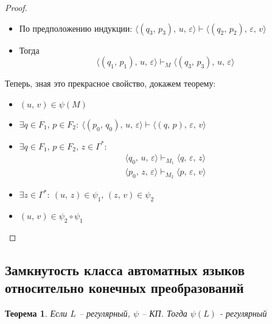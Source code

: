 \documentclass[a4paper,12pt]{article}
\theoremstyle{plain}
\newtheorem{theorem}{Теорема}[subsection]
\theoremstyle{definition}
\theoremstyle{remark}
\begin{document}
\begin{proof}
\begin{itemize}
\begin{itemize}
			      \item По предположению индукции: $\langle(q_3,\,p_3),\,u,\,\varepsilon\rangle\vdash\langle(q_2,\,p_2),\,\varepsilon,\,v\rangle$
			      \item Тогда
			            \[
				            \langle(q_1,\,p_1),\,u,\,\varepsilon\rangle\vdash_M\langle(q_3,\,p_3),\,u,\,\varepsilon\rangle
			            \]
		      \end{itemize}
	\end{itemize}
	Теперь, зная это прекрасное свойство, докажем теорему:
	\begin{itemize}
		\item $(u,\, v) \in \psi(M)$
		\item $\exists q \in F_1,\, p \in F_2 :\: \langle(p_0,\,q_0),\,u,\,\varepsilon\rangle\vdash\langle(q,\,p),\,\varepsilon,\,v\rangle$
		\item $\exists q \in F_1,\, p \in F_2,\, z \in \Gamma^*$:
		      \begin{align*}
			      \langle q_0,\,u,\,\varepsilon\rangle\vdash_{M_1}\langle q,\,\varepsilon,\,z\rangle \\
			      \langle p_0,\,z,\,\varepsilon\rangle\vdash_{M_2}\langle p,\,\varepsilon,\,v\rangle
		      \end{align*}
		\item $\exists z \in \Gamma^* :\: (u,\,z) \in \psi_1,\, (z,\, v) \in \psi_2$
		\item $(u,\,v) \in \psi_2\circ\psi_1$
	\end{itemize}
\end{proof}

\subsection{Замкнутость класса автоматных языков относительно конечных преобразований}
\begin{theorem}
	Если $L$ -- регулярный, $\psi$ -- КП. Тогда $\psi(L)$ - регулярный
\end{theorem}
\end{document}
